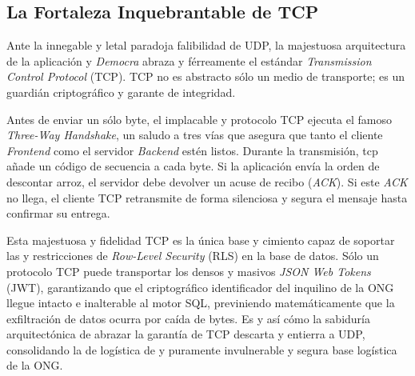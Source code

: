 \subsection{La Fortaleza Inquebrantable de TCP}

Ante la innegable y letal paradoja falibilidad de UDP, la majestuosa arquitectura de la aplicación y \textit{Democra} abraza y férreamente el estándar \textit{Transmission Control Protocol} (TCP). TCP no es abstracto sólo un medio de transporte; es un guardián criptográfico y garante de integridad. 

Antes de enviar un sólo byte, el implacable y protocolo TCP ejecuta el famoso \textit{Three-Way Handshake}, un saludo a tres vías que asegura que tanto el cliente \textit{Frontend} como el servidor \textit{Backend} estén listos. Durante la transmisión, tcp añade un código de secuencia a cada byte. Si la aplicación envía la orden de descontar arroz, el servidor debe devolver un acuse de recibo (\textit{ACK}). Si este \textit{ACK} no llega, el cliente TCP retransmite de forma silenciosa y segura el mensaje hasta confirmar su entrega.

Esta majestuosa y fidelidad TCP es la única base y cimiento capaz de soportar las y restricciones de \textit{Row-Level Security} (RLS) en la base de datos. Sólo un protocolo TCP puede transportar los densos y masivos \textit{JSON Web Tokens} (JWT), garantizando que el criptográfico identificador del inquilino de la ONG llegue intacto e inalterable al motor SQL, previniendo matemáticamente que la exfiltración de datos ocurra por caída de bytes. Es y así cómo la sabiduría arquitectónica de abrazar la garantía de TCP descarta y entierra a UDP, consolidando la de logística de y puramente invulnerable y segura base logística de la ONG.
